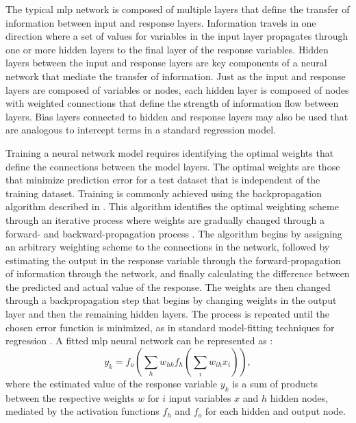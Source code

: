 \documentclass[article]{jss}
\begin{document}
The typical \ac{mlp} network is composed of multiple layers that
define the transfer of information between input and response layers.
Information travels in one direction where a set of values for
variables in the input layer propagates through one or more hidden
layers to the final layer of the response variables. Hidden layers
between the input and response layers are key components of a neural
network that mediate the transfer of information.  Just as the input
and response layers are composed of variables or nodes, each hidden
layer is composed of nodes with weighted connections that define the
strength of information flow between layers.  Bias layers connected to
hidden and response layers may also be used that are analogous to
intercept terms in a standard regression model.

Training a neural network model requires identifying the optimal
weights that define the connections between the model layers.  The
optimal weights are those that minimize prediction error for a test
dataset that is independent of the training dataset.  Training is
commonly achieved using the backpropagation algorithm described in
\citet{Rumelhart86}.  This algorithm identifies the optimal weighting
scheme through an iterative process where weights are gradually
changed through a forward- and backward-propagation process
\citep{Rumelhart86,Lek00}.  The algorithm begins by assigning an
arbitrary weighting scheme to the connections in the network, followed
by estimating the output in the response variable through the
forward-propagation of information through the network, and finally
calculating the difference between the predicted and actual value of
the response.  The weights are then changed through a backpropagation
step that begins by changing weights in the output layer and then the
remaining hidden layers.  The process is repeated until the chosen
error function is minimized, as in standard model-fitting techniques
for regression \citep{Cheng94}.  A fitted \ac{mlp} neural network can
be represented as \citep{Bishop95,Venables02}:
\begin{equation}
y_k = f_o \left(\sum\limits_{h} w_{hk}f_h \left( \sum\limits_{i} w_{ih}x_i\right) \right),
\end{equation}
where the estimated value of the response variable $y_k$ is a sum of
products between the respective weights $w$ for $i$ input variables
$x$ and $h$ hidden nodes, mediated by the activation functions $f_h$
and $f_o$ for each hidden and output node.
\end{document}
